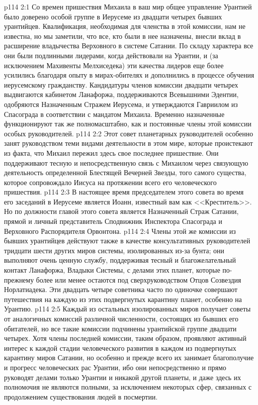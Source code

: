 \vs p114 2:1 Со времен пришествия Михаила в ваш мир общее управление Урантией было доверено особой группе в Иерусеме из двадцати четырех бывших урантийцев. Квалификация, необходимая для членства в этой комиссии, нам не известна, но мы заметили, что все, кто были в нее назначены, внесли вклад в расширение владычества Верховного в системе Сатании. По складу характера все они были подлинными лидерами, когда действовали на Урантии, и (за исключением Махивенты Мелхиседека) эти качества лидеров еще более усилились благодаря опыту в мирах\hyp{}обителях и дополнились в процессе обучения иерусемскому гражданству. Кандидатуры членов комиссии двадцати четырех выдвигаются кабинетом Ланафоржа, поддерживаются Всевышними Эдентии, одобряются Назначенным Стражем Иерусема, и утверждаются Гавриилом из Спасограда в соответствии с мандатом Михаила. Временно назначенные функционируют так же полномасштабно, как и постоянные члены этой комиссии особых руководителей.
\vs p114 2:2 Этот совет планетарных руководителей особенно занят руководством теми видами деятельности в этом мире, которые проистекают из факта, что Михаил пережил здесь свое последнее пришествие. Они поддерживают тесную и непосредственную связь с Михаилом через связующую деятельность определенной Блестящей Вечерней Звезды, того самого существа, которое сопровождало Иисуса на протяжении всего его человеческого пришествия.
\vs p114 2:3 В настоящее время председателем этого совета во время его заседаний в Иерусеме является Иоанн, известный вам как <<Креститель>>. Но по должности главой этого совета является Назначенный Страж Сатании, прямой и личный представитель Сподвижник Инспектора Спасограда и Верховного Распорядителя Орвонтона.
\vs p114 2:4 Члены этой же комиссии из бывших урантийцев действуют также в качестве консультативных руководителей тридцати шести других миров системы, изолированных из\hyp{}за бунта; они выполняют очень ценную службу, поддерживая тесный и благожелательный контакт Ланафоржа, Владыки Системы, с делами этих планет, которые по\hyp{}прежнему более или менее остаются под сверхруководством Отцов Созвездия Норлатиадека. Эти двадцать четыре советника часто по одиночке совершают путешествия на каждую из этих подвергнутых карантину планет, особенно на Урантию.
\vs p114 2:5 Каждый из остальных изолированных миров получает советы от аналогичных комиссий различной численности, состоящих из бывших его обитателей, но все такие комиссии подчинены урантийской группе двадцати четырех. Хотя члены последней комиссии, таким образом, проявляют активный интерес к каждой стадии человеческого развития в каждом из подвергнутых карантину миров Сатании, но особенно и прежде всего их занимает благополучие и прогресс человеческих рас Урантии, ибо они непосредственно и прямо руководят делами только Урантии и никакой другой планеты, и даже здесь их полномочия не являются полными, за исключением некоторых сфер, связанных с продолжением существования людей в посмертии.
